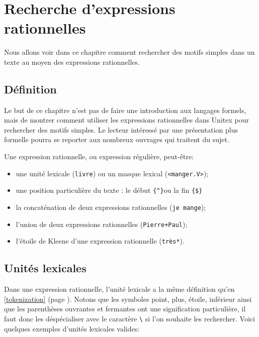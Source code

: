 \chapter{Recherche d’expressions rationnelles}
\label{chap-regexp}

Nous allons voir dans ce chapitre comment rechercher des motifs simples dans un texte
au moyen des expressions rationnelles.

\section{Définition}

Le but de ce chapitre n’est pas de faire une introduction aux langages formels, mais
de montrer comment utiliser les expressions rationnelles dans Unitex pour rechercher des
motifs simples. Le lecteur intéressé par une présentation plus formelle pourra se reporter
aux nombreux ouvrages qui traitent du sujet.


\bigskip \noindent Une expression rationnelle, ou expression régulière, peut-être:

\begin{itemize}
  \item une unité lexicale (\verb+livre+) ou un masque lexical
  (\verb+<manger.V>+);
  \item une position particulière du texte : le début \verb+{^}+ou la fin \verb+{$}+
  \item la concaténation de deux expressions rationnelles (\verb+je mange+);
  \item l'union de deux expressions rationnelles (\verb$Pierre+Paul$); 
  \item l’étoile de Kleene d’une expression rationnelle (\verb+très*+).
\end{itemize}


\section{Unités lexicales}

Dans une expression rationnelle, l’unité lexicale a la même définition qu’en \ref{tokenization}
(page \pageref{tokenization}). Notons que les symboles point, plus, étoile, inférieur ainsi que les
parenthèses ouvrantes et fermantes ont une signification particulière, il faut donc les
déspécialiser avec le caractère \verb+\+ si l’on souhaite les rechercher. Voici quelques exemples
d’unités lexicales valides: \index{\verbt{\textbackslash~}}

